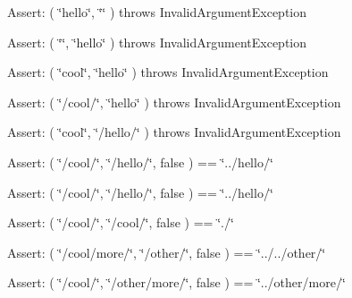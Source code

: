 \begin{Desc}
\item[Assert:]( \char`\"{}hello\char`\"{}, \char`\"{}\char`\"{} ) throws InvalidArgumentException \end{Desc}
\begin{Desc}
\item[Assert:]( \char`\"{}\char`\"{}, \char`\"{}hello\char`\"{} ) throws InvalidArgumentException \end{Desc}
\begin{Desc}
\item[Assert:]( \char`\"{}cool\char`\"{}, \char`\"{}hello\char`\"{} ) throws InvalidArgumentException \end{Desc}
\begin{Desc}
\item[Assert:]( \char`\"{}/cool/\char`\"{}, \char`\"{}hello\char`\"{} ) throws InvalidArgumentException \end{Desc}
\begin{Desc}
\item[Assert:]( \char`\"{}cool\char`\"{}, \char`\"{}/hello/\char`\"{} ) throws InvalidArgumentException \end{Desc}
\begin{Desc}
\item[Assert:]( \char`\"{}/cool/\char`\"{}, \char`\"{}/hello/\char`\"{}, false ) == \char`\"{}../hello/\char`\"{} \end{Desc}
\begin{Desc}
\item[Assert:]( \char`\"{}/cool/\char`\"{}, \char`\"{}/hello/\char`\"{}, false ) == \char`\"{}../hello/\char`\"{} \end{Desc}
\begin{Desc}
\item[Assert:]( \char`\"{}/cool/\char`\"{}, \char`\"{}/cool/\char`\"{}, false ) == \char`\"{}./\char`\"{} \end{Desc}
\begin{Desc}
\item[Assert:]( \char`\"{}/cool/more/\char`\"{}, \char`\"{}/other/\char`\"{}, false ) == \char`\"{}../../other/\char`\"{} \end{Desc}
\begin{Desc}
\item[Assert:]( \char`\"{}/cool/\char`\"{}, \char`\"{}/other/more/\char`\"{}, false ) == \char`\"{}../other/more/\char`\"{} \end{Desc}


